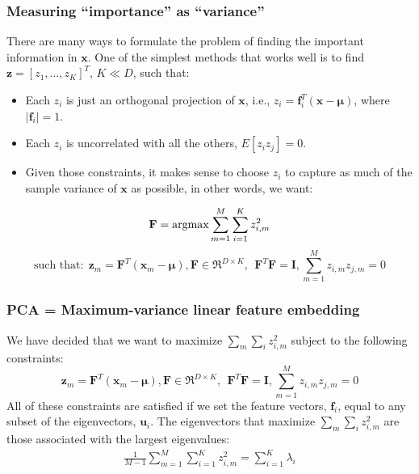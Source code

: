 \documentclass{beamer}
\newcommand{\argmax}{\operatornamewithlimits{argmax}}
\begin{document}
\begin{frame}
  \frametitle{Measuring ``importance'' as ``variance''}

  There are many ways to formulate the problem of finding the
  important information in $\mathbf{x}$.  One of the simplest methods
  that works well is to find $\mathbf{z}=[z_1,\ldots,z_K]^T$, $K\ll
  D$, such that:
  \begin{itemize}
  \item Each $z_i$ is just an orthogonal projection of $\mathbf{x}$, i.e., 
    $z_i=\mathbf{f}_i^T(\mathbf{x}-\bm{\mu})$, where $|\mathbf{f}_i|=1$.
  \item Each $z_i$ is uncorrelated with all the others,
    $E\left[z_iz_j\right]=0$.
  \item Given those constraints, it makes sense to choose $z_i$ to
    capture as much of the sample variance of $\mathbf{x}$ as
    possible, in other words, we want:
  \end{itemize}
  \begin{displaymath}
    \mathbf{F} = \argmax\sum_{m=1}^M\sum_{i=1}^K z_{i,m}^2
  \end{displaymath}
  \begin{displaymath}
    \text{such that:}~~\mathbf{z}_m=\mathbf{F}^T(\mathbf{x}_m-\bm{\mu}),
    \mathbf{F}\in\Re^{D\times K},~~\mathbf{F}^T\mathbf{F}=\mathbf{I},
    \sum_{m=1}^Mz_{i,m}z_{j,m}=0
  \end{displaymath}
\end{frame}

\begin{frame}
  \frametitle{PCA = Maximum-variance linear feature embedding}

  We have decided that we want to maximize $\sum_m\sum_i z_{i,m}^2$ subject to the
  following constraints:
  \begin{displaymath}
    \mathbf{z}_m=\mathbf{F}^T(\mathbf{x}_m-\bm{\mu}),
    \mathbf{F}\in\Re^{D\times K},~~\mathbf{F}^T\mathbf{F}=\mathbf{I},
    \sum_{m=1}^Mz_{i,m}z_{j,m}=0
  \end{displaymath}
  All of these constraints are satisfied if we set the feature
  vectors, $\mathbf{f}_i$, equal to any subset of the eigenvectors,
  $\mathbf{u}_i$.  The eigenvectors that maximize $\sum_m\sum_iz_{i,m}^2$
  are those associated with the largest eigenvalues:
  \begin{align*}
    \frac{1}{M-1}\sum_{m=1}^M\sum_{i=1}^K z_{i,m}^2 = \sum_{i=1}^K \lambda_i
  \end{align*}
\end{frame}
\end{document}
